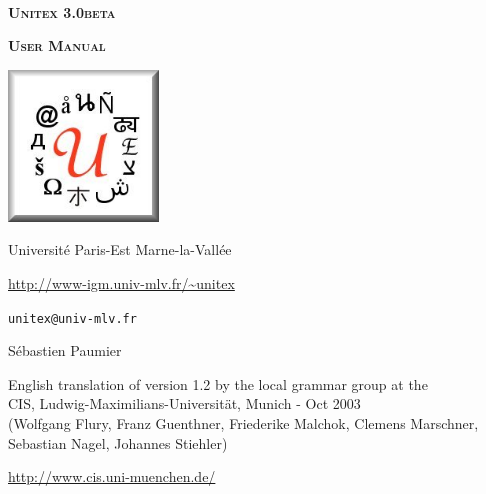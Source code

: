 
\begin{titlepage}
\begin{center}

~

\vspace{3cm}
\Huge
\textsc{\textbf{Unitex 3.0beta}}

\vspace{1cm}

\huge
\textsc{\textbf{User Manual}}

\vspace{2cm}

  \begin{center}
    \includegraphics[width=4cm]{resources/img/logo-Unitex.png}
  \end{center}
\normalsize

\vspace{2cm}

\LARGE

Universit\'e Paris-Est Marne-la-Vall\'ee
\bigskip
\normalsize

\url{http://www-igm.univ-mlv.fr/~unitex}

\verb$unitex@univ-mlv.fr$

\vspace{1cm}

S\'ebastien Paumier
\bigskip

English translation of version 1.2 by the local grammar group at the\\
 CIS, Ludwig-Maximilians-Universit\"at, Munich - Oct 2003\\
 (Wolfgang Flury, Franz Guenthner, Friederike Malchok, Clemens Marschner, 
 Sebastian Nagel, Johannes Stiehler)

\url{http://www.cis.uni-muenchen.de/}
\end{center}

\end{titlepage}
